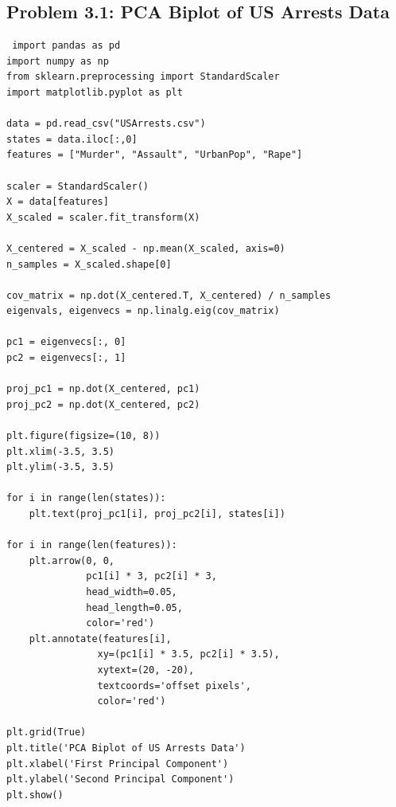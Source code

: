 \documentclass[11pt]{article}
\begin{document}
\subsection{Problem 3.1: PCA Biplot of US Arrests Data}
\begin{verbatim}
 import pandas as pd
import numpy as np
from sklearn.preprocessing import StandardScaler
import matplotlib.pyplot as plt

data = pd.read_csv("USArrests.csv")
states = data.iloc[:,0]
features = ["Murder", "Assault", "UrbanPop", "Rape"]

scaler = StandardScaler()
X = data[features]
X_scaled = scaler.fit_transform(X)

X_centered = X_scaled - np.mean(X_scaled, axis=0)
n_samples = X_scaled.shape[0]

cov_matrix = np.dot(X_centered.T, X_centered) / n_samples
eigenvals, eigenvecs = np.linalg.eig(cov_matrix)

pc1 = eigenvecs[:, 0]
pc2 = eigenvecs[:, 1]

proj_pc1 = np.dot(X_centered, pc1)
proj_pc2 = np.dot(X_centered, pc2)

plt.figure(figsize=(10, 8))
plt.xlim(-3.5, 3.5)
plt.ylim(-3.5, 3.5)

for i in range(len(states)):
    plt.text(proj_pc1[i], proj_pc2[i], states[i])

for i in range(len(features)):
    plt.arrow(0, 0, 
              pc1[i] * 3, pc2[i] * 3, 
              head_width=0.05, 
              head_length=0.05, 
              color='red')
    plt.annotate(features[i],
                xy=(pc1[i] * 3.5, pc2[i] * 3.5),
                xytext=(20, -20),
                textcoords='offset pixels', 
                color='red')

plt.grid(True)
plt.title('PCA Biplot of US Arrests Data')
plt.xlabel('First Principal Component')
plt.ylabel('Second Principal Component')
plt.show() 
\end{verbatim}
\end{document}

